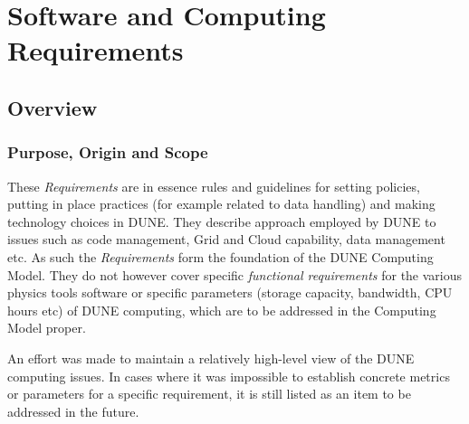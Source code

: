 \section{Software and Computing Requirements}
\label{sec:requirements}
\subsection{Overview}
\subsubsection{Purpose, Origin and Scope}

These \textit{Requirements} are in essence rules and guidelines for setting policies,
putting in place practices (for example related to data handling) and making technology choices in DUNE.
They describe approach employed by DUNE to issues such as  code management, Grid and Cloud capability, data management etc.
As such  the \textit{Requirements} form the foundation of the DUNE Computing Model. They do not however cover specific \textit{functional requirements}
for the various physics tools software or specific parameters (storage capacity, bandwidth, CPU hours etc) of DUNE computing,
which are to be addressed in the Computing Model proper.

An effort was made to maintain a relatively high-level view of the DUNE computing issues. In cases where it was impossible to establish concrete metrics or
parameters for a specific requirement, it is still listed as an item to be addressed in the future.




